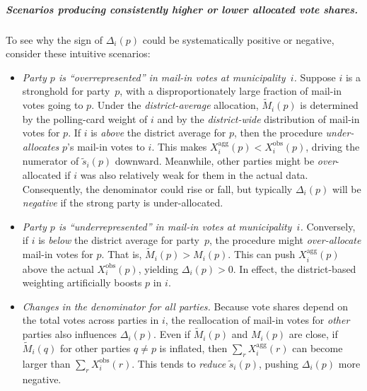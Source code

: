 \documentclass[12pt]{article}
\begin{document}
\subparagraph{Scenarios producing consistently higher or lower allocated vote shares.}
To see why the sign of \(\Delta_i(p)\) could be systematically positive or negative, consider these intuitive scenarios:

\begin{itemize}
  \item \textit{Party \(p\) is ``overrepresented'' in mail-in votes at municipality~\(i\).} 
  Suppose \(i\) is a stronghold for party~\(p\), with a disproportionately large fraction of mail-in votes going to \(p\). Under the \emph{district-average} allocation, \(\widetilde{M}_i(p)\) is determined by the polling-card weight of \(i\) and by the \emph{district-wide} distribution of mail-in votes for \(p\). If \(i\) is \textit{above} the district average for \(p\), then the procedure \emph{under-allocates} \(p\)’s mail-in votes to \(i\). This makes \(X_i^{\text{agg}}(p) < X_i^{\text{obs}}(p)\), driving the numerator of \(\widetilde{s}_i(p)\) downward. Meanwhile, other parties might be \emph{over}-allocated if \(i\) was also relatively weak for them in the actual data. Consequently, the denominator could rise or fall, but typically \(\Delta_i(p)\) will be \emph{negative} if the strong party is under-allocated.

  \item \textit{Party \(p\) is ``underrepresented'' in mail-in votes at municipality~\(i\).}
  Conversely, if \(i\) is \emph{below} the district average for party~\(p\), the procedure might \emph{over-allocate} mail-in votes for \(p\). That is, \(\widetilde{M}_i(p) > M_i(p)\). This can push \(X_i^{\text{agg}}(p)\) above the actual \(X_i^{\text{obs}}(p)\), yielding \(\Delta_i(p) > 0\). In effect, the district-based weighting artificially boosts \(p\) in \(i\).

  \item \textit{Changes in the denominator for all parties.} 
  Because vote shares depend on the total votes across parties in \(i\), the reallocation of mail-in votes for \emph{other} parties also influences \(\Delta_i(p)\). Even if \(\widetilde{M}_i(p)\) and \(M_i(p)\) are close, if \(\widetilde{M}_i(q)\) for other parties \(q \ne p\) is inflated, then \(\sum_{r}X_i^{\text{agg}}(r)\) can become larger than \(\sum_{r}X_i^{\text{obs}}(r)\). This tends to \emph{reduce} \(\widetilde{s}_i(p)\), pushing \(\Delta_i(p)\) more negative.
\end{itemize}
\end{document}
